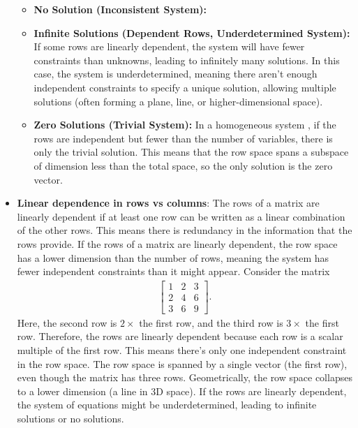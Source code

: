 \documentclass{report}
\begin{document}
\begin{itemize}
\begin{itemize}
            \item \textbf{No Solution (Inconsistent System):}
            \item \textbf{Infinite Solutions (Dependent Rows, Underdetermined System):} If some rows are linearly dependent, the system will have fewer constraints than unknowns, leading to infinitely many solutions. In this case, the system is underdetermined, meaning there aren’t enough independent constraints to specify a unique solution, allowing multiple solutions (often forming a plane, line, or higher-dimensional space).
            \item \textbf{Zero Solutions (Trivial System):} In a homogeneous system , if the rows are independent but fewer than the number of variables, there is only the trivial solution. This means that the row space spans a subspace of dimension less than the total space, so the only solution is the zero vector.
        \end{itemize}
    \item \textbf{Linear dependence in rows vs columns}:
        The rows of a matrix are linearly dependent if at least one row can be written as a linear combination of the other rows.
        \bigbreak \noindent 
        This means there is redundancy in the information that the rows provide.
        \bigbreak \noindent 
        If the rows of a matrix are linearly dependent, the row space has a lower dimension than the number of rows, meaning the system has fewer independent constraints than it might appear.
        \bigbreak \noindent 
        Consider the matrix
        \begin{align*}
            \begin{bmatrix} 1 & 2 & 3 \\ 2 & 4 & 6 \\ 3 & 6 & 9 \end{bmatrix}
        .\end{align*}
        \bigbreak \noindent 
        Here, the second row is $2\times$ the first row, and the third row is $3\times$ the first row. Therefore, the rows are linearly dependent because each row is a scalar multiple of the first row.
        \bigbreak \noindent 
        This means there’s only one independent constraint in the row space. The row space is spanned by a single vector (the first row), even though the matrix has three rows. Geometrically, the row space collapses to a lower dimension (a line in 3D space).
        \bigbreak \noindent 
        If the rows are linearly dependent, the system of equations might be underdetermined, leading to infinite solutions or no solutions.

\end{itemize}
\end{document}
